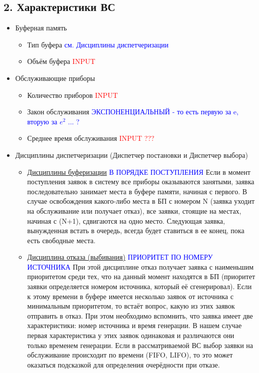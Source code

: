 \documentclass[a4paper,11pt]{report}
\begin{document}
\subsection{2. Характеристики ВС}
\begin{itemize}
  \item Буферная память
  \begin{itemize}
    \item Тип буфера \textcolor{blue}{см. Дисциплины диспетчеризации}
    \item Объём буфера \textcolor{red}{INPUT}
  \end{itemize}
  \item Обслуживающие приборы
  \begin{itemize}
    \item Количество приборов \textcolor{red}{INPUT}
    \item Закон обслуживания \textcolor{blue}{ЭКСПОНЕНЦИАЛЬНЫЙ - то есть первую за e, вторую за $e^2$ ... ?}
    \item Среднее время обслуживания \textcolor{red}{INPUT ???}
  \end{itemize}
  \item Дисциплины диспетчеризации (Диспетчер постановки и Диспетчер выбора)
  \begin{itemize}
    \item \underline{Дисциплины буферизации} \textcolor{blue}{В ПОРЯДКЕ ПОСТУПЛЕНИЯ}
    \newline Если в момент поступления заявок в систему все приборы оказываются занятыми, заявка последовательно занимает места в буфере памяти, начиная с первого. В случае освобождения какого-либо места в БП с номером N (заявка уходит на обслуживание или получает отказ), все заявки, стоящие на местах, начиная с (N+1), сдвигаются на одно место. Следующая заявка, вынужденная встать в очередь, всегда будет ставиться в ее конец, пока есть свободные места.
    \item \underline{Дисциплина отказа (выбивания)} \textcolor{blue}{ПРИОРИТЕТ ПО НОМЕРУ ИСТОЧНИКА}
    \newline При этой дисциплине отказ получает заявка с наименьшим приоритетом среди тех, что на данный момент находятся в БП (приоритет заявки определяется номером источника, который её сгенерировал). Если к этому времени в буфере имеется несколько заявок от источника с минимальным приоритетом, то встаёт вопрос, какую из этих заявок отправить в отказ.
    \newline При этом необходимо вспомнить, что заявка имеет две характеристики: номер источника и время генерации. В нашем случае первая характеристика у этих заявок одинаковая и различаются они только временем генерации. Если в рассматриваемой ВС выбор заявки на обслуживание происходит по времени (FIFO, LIFO), то это может оказаться подсказкой для определения очерёдности при отказе.

\end{itemize}
\end{itemize}
\end{document}
